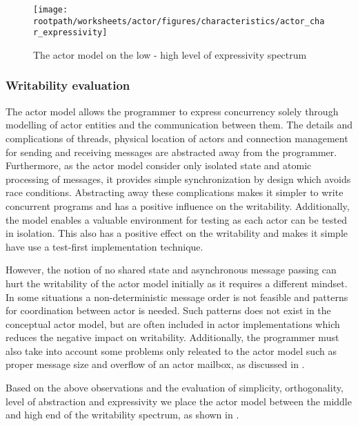 
\begin{figure}[htbp]
\centering
 \texttt{[image: \\rootpath/worksheets/actor/figures/characteristics/actor\_char\_expressivity]} 
 \caption{The actor model on the low - high level of expressivity spectrum}
\label{fig:actor_expressivity}
\end{figure}

\subsubsection{Writability evaluation}
The actor model allows the programmer to express concurrency solely through modelling of actor entities and the communication between them. The details and complications of threads, physical location of actors and connection management for sending and receiving messages are abstracted away from the programmer. Furthermore, as the actor model consider only isolated state and atomic processing of messages, it provides simple synchronization by design which avoids race conditions. Abstracting away these complications makes it simpler to write concurrent programs and has a positive influence on the writability. Additionally, the model enables a valuable environment for testing as each actor can be tested in isolation. This also has a positive effect on the writability and makes it simple have use a test-first implementation technique.

However, the notion of no shared state and asynchronous message passing can hurt the writability of the actor model initially as it requires a different mindset. In some situations a non-deterministic message order is not feasible and patterns for coordination between actor is needed. Such patterns does not exist in the conceptual actor model, but are often included in actor implementations which reduces the negative impact on writability. Additionally, the programmer must also take into account some problems only releated to the actor model such as proper message size and overflow of an actor mailbox, as discussed in .

Based on the above observations and the evaluation of simplicity, orthogonality, level of abstraction and expressivity we place the actor model between the middle and high end of the writability spectrum, as shown in .

